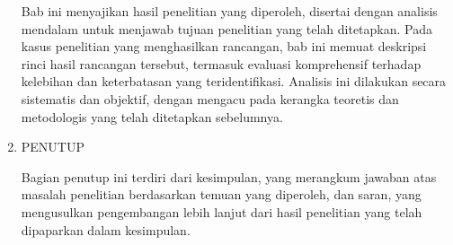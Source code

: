 \begin{enumerate}
Bab ini menyajikan hasil penelitian yang diperoleh, disertai dengan
analisis mendalam untuk menjawab tujuan penelitian yang telah ditetapkan.
Pada kasus penelitian yang menghasilkan rancangan, bab ini memuat
deskripsi rinci hasil rancangan tersebut, termasuk evaluasi komprehensif
terhadap kelebihan dan keterbatasan yang teridentifikasi. Analisis
ini dilakukan secara sistematis dan objektif, dengan mengacu pada
kerangka teoretis dan metodologis yang telah ditetapkan sebelumnya.
\item PENUTUP

Bagian penutup ini terdiri dari kesimpulan, yang merangkum jawaban
atas masalah penelitian berdasarkan temuan yang diperoleh, dan saran,
yang mengusulkan pengembangan lebih lanjut dari hasil penelitian yang
telah dipaparkan dalam kesimpulan.
\end{enumerate}